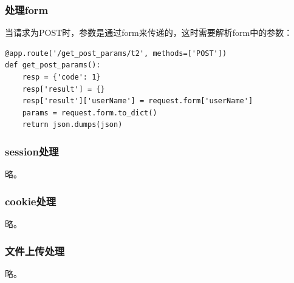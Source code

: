 \documentclass{article}
\begin{document}
\subsubsection{处理form}
当请求为POST时，参数是通过form来传递的，这时需要解析form中的参数：
\begin{lstlisting}
@app.route('/get_post_params/t2', methods=['POST'])
def get_post_params():
    resp = {'code': 1}
    resp['result'] = {}
    resp['result']['userName'] = request.form['userName']
    params = request.form.to_dict()
    return json.dumps(json)
\end{lstlisting}
\subsubsection{session处理}
略。
\subsubsection{cookie处理}
略。
\subsubsection{文件上传处理}
略。
\end{document}
